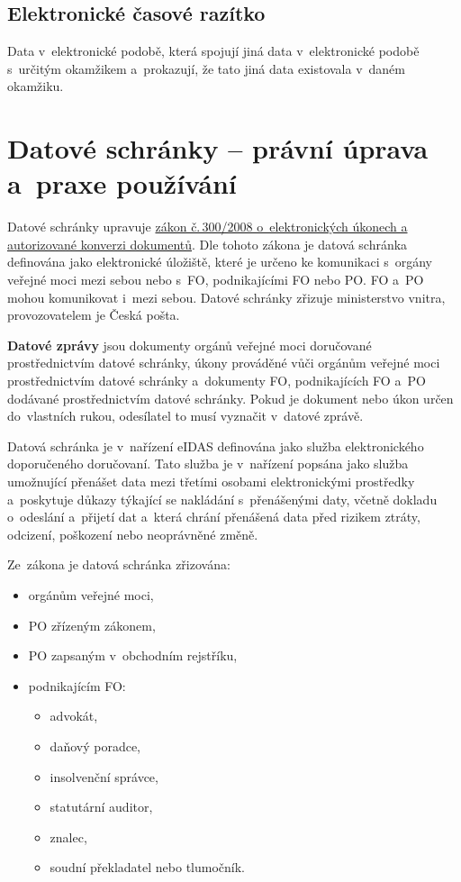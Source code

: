 \subsection{Elektronické časové razítko}

Data v~elektronické podobě, která spojují jiná data v~elektronické podobě s~určitým okamžikem a~prokazují, že tato jiná data existovala v~daném okamžiku.







\clearpage
\section{Datové schránky -- právní úprava a~praxe používání}

Datové schránky upravuje \href{https://www.zakonyprolidi.cz/cs/2008-300}{zákon č.\,300/2008 o~elektronických úkonech a autorizované konverzi dokumentů}. Dle tohoto zákona je datová schránka definována jako elektronické úložiště, které je určeno ke komunikaci s~orgány veřejné moci mezi sebou nebo s~FO, podnikajícími FO nebo PO. FO a~PO mohou komunikovat i~mezi sebou. Datové schránky zřizuje ministerstvo vnitra, provozovatelem je Česká pošta.

\textbf{Datové zprávy} jsou dokumenty orgánů veřejné moci doručované prostřednictvím datové schránky, úkony prováděné vůči orgánům veřejné moci prostřednictvím datové schránky a~dokumenty FO, podnikajících FO a~PO dodávané prostřednictvím datové schránky. Pokud je dokument nebo úkon určen do~vlastních rukou, odesílatel to musí vyznačit v~datové zprávě.

Datová schránka je v~nařízení eIDAS definována jako služba elektronického doporučeného doručovaní. Tato služba je v~nařízení popsána jako služba umožnující přenášet data mezi třetími osobami elektronickými prostředky a~poskytuje důkazy týkající se nakládání s~přenášenými daty, včetně dokladu o~odeslání a~přijetí dat a~která chrání přenášená data před rizikem ztráty, odcizení, poškození nebo neoprávněné změně.

Ze~zákona je datová schránka zřizována:

\begin{itemize}
    \item orgánům veřejné moci,
    \item PO zřízeným zákonem,
    \item PO zapsaným v~obchodním rejstříku,
    \item podnikajícím FO:
          \begin{itemize}
              \item advokát,
              \item daňový poradce,
              \item insolvenční správce,
              \item statutární auditor,
              \item znalec,
              \item soudní překladatel nebo tlumočník.
          \end{itemize}
\end{itemize}

